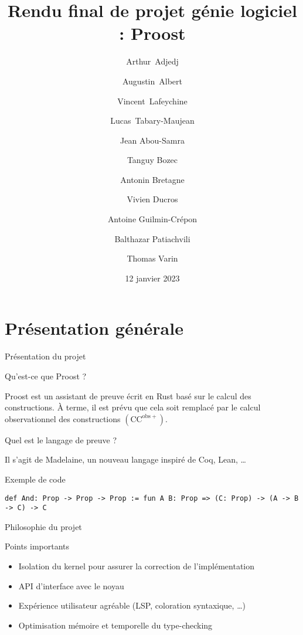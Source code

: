 \documentclass[12pt]{beamer}
\title[Rendu final : Proost]{Rendu final de projet génie logiciel : Proost}
\author[Projet génie logiciel]{
    Arthur~Adjedj \and 
    Augustin~Albert \and
    Vincent~Lafeychine \and
    Lucas~Tabary-Maujean \and
    Jean Abou-Samra \and
    Tanguy Bozec \and
    Antonin Bretagne \and 
    Vivien Ducros \and
    Antoine Guilmin-Crépon \and
    Balthazar Patiachvili \and
    Thomas Varin
}
\date{12 janvier 2023}
\institute[]{ENS Paris-Saclay}
\begin{document}
    \maketitle

    \section{Présentation générale}

        \begin{frame}[fragile]{Présentation du projet}
        
            \begin{block}{Qu'est-ce que Proost ?}
                
                Proost est un assistant de preuve écrit en Rust basé sur le calcul des constructions. À terme, il est prévu que cela soit remplacé par le calcul observationnel des constructions $\left(\mathrm{CC}^{\mathrm{obs}+}\right)$.

            \end{block} \pause

            \begin{block}{Quel est le langage de preuve ?}
                
                Il s'agit de Madelaine, un nouveau langage inspiré de Coq, Lean, \dots

            \end{block} \pause

            \begin{exampleblock}{Exemple de code}
                
                \begin{lstlisting}[language=mdln]
                    def And: Prop -> Prop -> Prop := fun A B: Prop => (C: Prop) -> (A -> B -> C) -> C
                \end{lstlisting}

            \end{exampleblock}

        \end{frame}

        \begin{frame}{Philosophie du projet}
            
            \begin{alertblock}{Points importants}
                
                \begin{itemize}
                    \item Isolation du kernel pour assurer la correction de l'implémentation \pause
                    \item API d'interface avec le noyau \pause
                    \item Expérience utilisateur agréable (LSP, coloration syntaxique, \dots) \pause
                    \item Optimisation mémoire et temporelle du type-checking
                \end{itemize}

            \end{alertblock}

        \end{frame}
\end{document}
